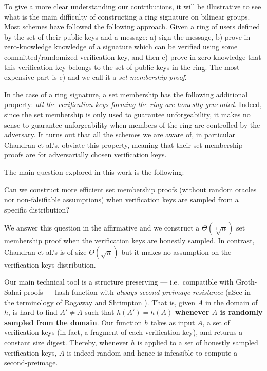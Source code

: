 
To give a more clear understanding our contributions, it will be illustrative to see what is the main difficulty of constructing a ring signature on bilinear groups. Most schemes have followed the following approach. Given a ring of users defined by the set of their public keys and a message: a) sign the message, b) prove in zero-knowledge knowledge of a signature which can be verified using some committed/randomized verification key, and then c) prove in zero-knowledge that this verification key belongs to the set of public keys in the ring.  The most expensive part is c) and we call it a \emph{set membership proof}.

In the case of a ring signature, a set membership has the following additional property: \emph{all the verification keys forming the ring are honestly generated}. 
Indeed, since the set membership is only used to guarantee unforgeability, it makes no sense to guarantee unforgeability when members of the ring are controlled by the adversary.
It turns out that all the schemes we are aware of, in particular Chandran et al.'s, obviate this property, meaning that their set membership proofs are for adversarially chosen verification keys.

The main question explored in this work is the following:
\begin{displayquote}
Can we construct more efficient set membership proofs (without random oracles nor non-falsifiable assumptions) when verification keys are sampled from a specific distribution?
\end{displayquote}
We answer this question in the affirmative and we construct a $\Theta(\sqrt[3]{n})$ set membership proof when the verification keys are honestly sampled. In contrast, Chandran et al.'s is of size $\Theta(\sqrt{n})$ but it makes no assumption on the verification keys distribution.

Our main technical tool is a structure preserving --- i.e.~compatible with Groth-Sahai proofs --- hash function with \emph{always second-preimage resistance} (aSec in the terminology of Rogaway and Shrimpton \cite{FSE:RogShr04}). That is, given $A$ in the domain of $h$, is hard to find $A'\neq A$ such that $h(A')=h(A)$ {\bf whenever $A$ is randomly sampled from the domain}.
Our function $h$ takes as input $A$, a set of verification keys (in fact, a fragment of each verification key), and returns a constant size digest. Thereby, whenever $h$ is applied to a set of honestly sampled verification keys, $A$ is indeed random and hence is infeasible to compute a second-preimage.

